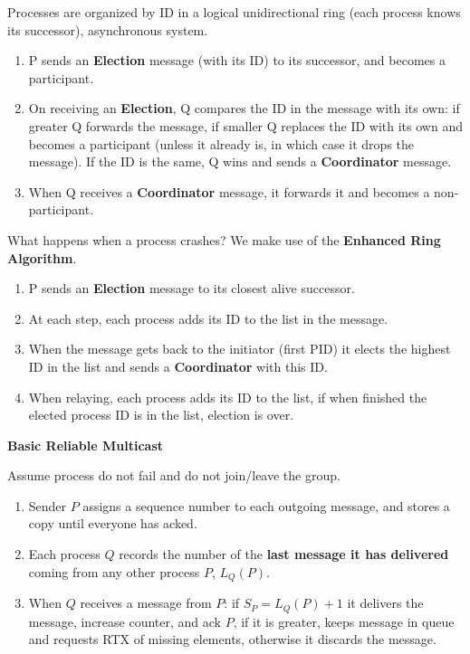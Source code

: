 \documentclass[a4paper, 10pt, twocolumn]{article}
\begin{document}
    Processes are organized by ID in a logical unidirectional ring (each process knows its successor), asynchronous system.
    \begin{enumerate}
        \item P sends an \textbf{Election} message (with its ID) to its successor, and becomes a participant.
        \item On receiving an \textbf{Election}, Q compares the ID in the message with its own: if greater Q forwards the message, if smaller Q replaces the ID with its own and becomes a participant (unless it already is, in which case it drops the message). If the ID is the same, Q wins and sends a \textbf{Coordinator} message.
        \item When Q receives a \textbf{Coordinator} message, it forwards it and becomes a non-participant.
    \end{enumerate}
    What happens when a process crashes? We make use of the \textbf{Enhanced Ring Algorithm}.
    \begin{enumerate}
        \item P sends an \textbf{Election} message to its closest alive successor.
        \item At each step, each process adds its ID to the list in the message.
        \item When the message gets back to the initiator (first PID) it elects the highest ID in the list and sends a \textbf{Coordinator} with this ID.
        \item When relaying, each process adds its ID to the list, if when finished the elected process ID is in the list, election is over.
    \end{enumerate}

    \textbf{Basic Reliable Multicast}

    Assume process do not fail and do not join/leave the group.
    \begin{enumerate}
        \item Sender $P$ assigns a sequence number to each outgoing message, and stores a copy until everyone has acked.
        \item Each process $Q$ records the number of the \textbf{last message it has delivered} coming from any other process $P$, $L_Q(P)$.
        \item When $Q$ receives a message from $P$: if $S_P = L_Q(P) + 1$ it delivers the message, increase counter, and ack $P$, if it is greater, keeps message in queue and requests RTX of missing elements, otherwise it discards the message.
    \end{enumerate}
\end{document}
